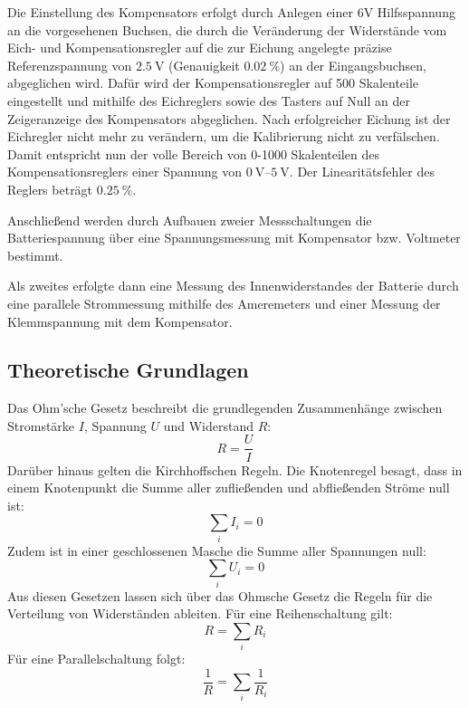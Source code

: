 Die Einstellung des Kompensators erfolgt durch Anlegen einer 6V Hilfsspannung an die vorgesehenen Buchsen, die durch die Veränderung der Widerstände vom Eich- und Kompensationsregler auf die zur Eichung angelegte präzise Referenzspannung von \(\qty{2.5}{\volt}\) (Genauigkeit \(\qty{0.02}{\percent}\)) an der Eingangsbuchsen, abgeglichen wird. Dafür wird der Kompensationsregler auf 500 Skalenteile eingestellt und mithilfe des Eichreglers sowie des Tasters auf Null an der Zeigeranzeige des Kompensators abgeglichen. Nach erfolgreicher Eichung ist der Eichregler nicht mehr zu verändern, um die Kalibrierung nicht zu verfälschen. Damit entspricht nun der volle Bereich von 0-1000 Skalenteilen des Kompensationsreglers einer Spannung von \(\qtyrange{0}{5}{\volt}\). Der Linearitätsfehler des Reglers beträgt \(\qty{0.25}{\percent}\).

Anschließend werden durch Aufbauen zweier Messschaltungen die Batteriespannung über eine Spannungsmessung mit Kompensator bzw. Voltmeter bestimmt. 

Als zweites erfolgte dann eine Messung des Innenwiderstandes der Batterie durch eine parallele Strommessung mithilfe des Ameremeters und einer Messung der Klemmspannung mit dem Kompensator.
\newpage
\subsection[Theoretische Grundlagen]{Theoretische Grundlagen \autocite{Skript_1}}
Das Ohm'sche Gesetz beschreibt die grundlegenden Zusammenhänge zwischen Stromstärke \(I\), Spannung \(U\) und Widerstand \(R\):
\begin{equation}
    R = \frac{U}{I}
    \label{eq:ohm}
\end{equation}
Darüber hinaus gelten die Kirchhoffschen Regeln. Die Knotenregel besagt, dass in einem Knotenpunkt die Summe aller zufließenden und abfließenden Ströme null ist:
\begin{equation}
    \sum_{i} I_i = 0
    \label{eq:knoten}
\end{equation}
Zudem ist in einer geschlossenen Masche die Summe aller Spannungen null:
\begin{equation}
    \sum_{i} U_i = 0
    \label{eq:masche}
\end{equation}
Aus diesen Gesetzen lassen sich über das Ohmsche Gesetz die Regeln für die Verteilung von Widerständen ableiten. Für eine Reihenschaltung gilt:
\begin{equation}
    R = \sum_{i} R_i
    \label{eq:reihe}
\end{equation}
Für eine Parallelschaltung folgt:
\begin{equation}
    \frac{1}{R} = \sum_{i} \frac{1}{R_i}
    \label{eq:parallel}
\end{equation}

